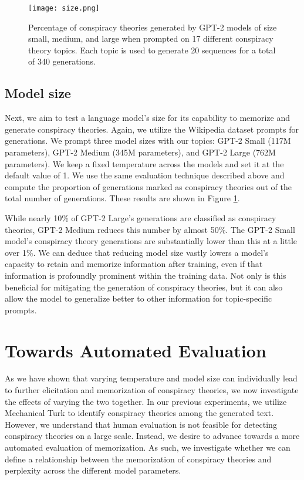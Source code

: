 \documentclass[11pt,a4paper]{article}
\begin{document}
\begin{figure}[t]
  \centering
  \texttt{[image: size.png]}
  \caption{Percentage of conspiracy theories generated by GPT-2 models of size small, medium, and large when prompted on 17 different conspiracy theory topics. Each topic is used to generate 20 sequences for a total of 340 generations.}\label{fig:size}
\end{figure}

\subsection{Model size}
Next, we aim to test a language model's size for its capability to memorize and generate conspiracy theories. Again, we utilize the Wikipedia dataset prompts for generations. We prompt three model sizes with our topics: GPT-2 Small (117M parameters), GPT-2 Medium  (345M parameters), and GPT-2 Large (762M parameters). We keep a fixed temperature across the models and set it at the default value of 1. We use the same evaluation technique described above and compute the proportion of generations marked as conspiracy theories out of the total number of generations. These results are shown in Figure \ref{fig:size}. 

While nearly 10\% of GPT-2 Large's generations are classified as conspiracy theories, GPT-2 Medium reduces this number by almost 50\%. The GPT-2 Small model's conspiracy theory generations are substantially lower than this at a little over 1\%. We can deduce that reducing model size vastly lowers a model's capacity to retain and memorize information after training, even if that information is profoundly prominent within the training data. Not only is this beneficial for mitigating the generation of conspiracy theories, but it can also allow the model to generalize better to other information for topic-specific prompts.


\section{Towards Automated Evaluation}
As we have shown that varying temperature and model size can individually lead to further elicitation and memorization of conspiracy theories, we now investigate the effects of varying the two together. In our previous experiments, we utilize Mechanical Turk to identify conspiracy theories among the generated text. However, we understand that human evaluation is not feasible for detecting conspiracy theories on a large scale. Instead, we desire to advance towards a more automated evaluation of memorization. As such, we investigate whether we can define a relationship between the memorization of conspiracy theories and perplexity across the different model parameters. 
\end{document}
